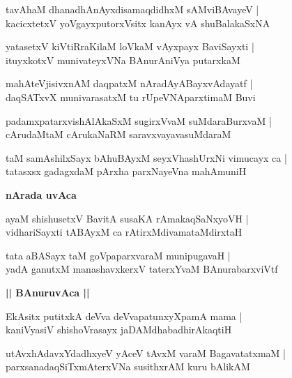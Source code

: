 \documentclass[twoside,12pt,openright]{book}
\newcounter{shloka}[chapter]
\def\uvaca#1{\centerline{{\large\textbf{#1}}}}
\begin{document}
\begin{shloka}%
tavAhaM dhanadhAnAyxdisamaqdidhxM sAMviBAvayeV |\\
kacicxtetxV yoVgayxputorxVsitx kanAyx vA shuBalakaSxNA 
\end{shloka}

\begin{shloka}%
yatasetxV kiVtiRraKilaM loVkaM vAyxpayx BaviSayxti |\\
ituyxkotxV munivateyxVNa BAnurAniVya putarxkaM 
\end{shloka}

\begin{shloka}%
mahAteVjisivxnAM daqpatxM nAradAyABayxvAdayatf |\\
daqSATxvX munivarasatxM tu rUpeVNAparxtimaM Buvi
\end{shloka}

\begin{shloka}%
padamxpatarxvishAlAkaSxM sugirxVvaM suMdaraBurxvaM |\\
cArudaMtaM cArukaNaRM saravxvayavasuMdaraM 
\end{shloka}

\begin{shloka}%
taM samAshilxSayx bAhuBAyxM seyxVhashUrxNi vimucayx ca |\\
tatasxsx gadagxdaM pArxha parxNayeVna mahAmuniH 
\end{shloka}

\uvaca{ nArada uvAca }

\begin{shloka}%
ayaM shishusetxV BavitA susaKA rAmakaqSaNxyoVH |\\
vidhariSayxti tABAyxM ca rAtirxMdivamataMdirxtaH 
\end{shloka}

\begin{shloka}%
tata aBASayx taM goVpaparxvaraM munipugavaH |\\
yadA ganutxM manashavxkerxV taterxYvaM BAnurabarxviVtf 
\end{shloka}

\uvaca{|| BAnuruvAca ||}

\begin{shloka}%
EkAsitx putitxkA deVva deVvapatunxyXpamA mama |\\
kaniVyasiV shishoVrasayx jaDAMdhabadhirAkaqtiH 
\end{shloka}

\begin{shloka}%
utAvxhAdavxYdadhxyeV yAceV tAvxM varaM BagavatatxmaM |\\
parxsanadaqSiTxmAterxVNa susithxrAM kuru bAlikAM 
\end{shloka}
\end{document}
